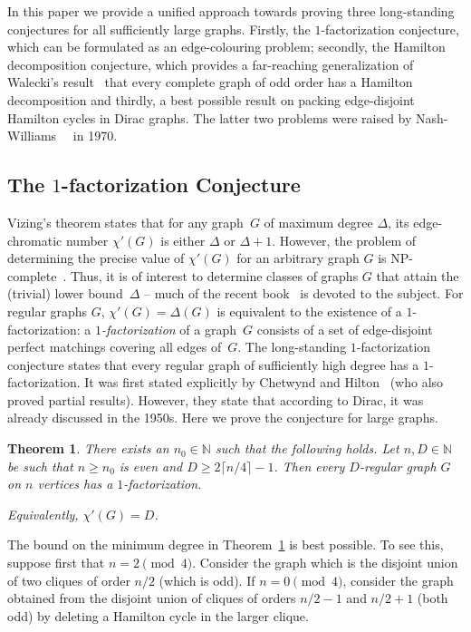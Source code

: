 \documentclass{memo-l}
\newtheorem{thm}[firstthm]{Theorem}
\def\COMMENT#1{}
\numberwithin{section}{chapter}
\numberwithin{equation}{section}
\numberwithin{firstthm}{section}
\numberwithin{figure}{section}
\begin{document}
In this paper we provide a unified approach towards proving three long-standing conjectures
for all sufficiently large graphs. Firstly, the $1$-factorization conjecture, which can be formulated as an edge-colouring problem;
secondly, the Hamilton decomposition conjecture, which provides a far-reaching generalization of Walecki's result~\cite{lucas} that
every complete graph of odd order has a Hamilton decomposition and  
thirdly, a best possible result on packing edge-disjoint 
Hamilton cycles in Dirac graphs. The latter two problems were raised by Nash-Williams~~\cite{initconj,Diracext,decompconj} in 1970. 


\subsection{The $1$-factorization Conjecture}

Vizing's theorem states that for any graph~$G$ of maximum degree $\Delta$, its edge-chromatic number
$\chi'(G)$ is either $\Delta$ or $\Delta+1$. 
However, the problem of determining the precise value of $\chi '(G)$
for an arbitrary graph $G$ is NP-complete~\cite{NP}. 
Thus, it is of interest to determine classes of graphs $G$ that attain the (trivial) lower bound~$\Delta$
-- much of the recent book~\cite{stiebitz} is devoted to the subject.
For regular graphs $G$, $\chi'(G)=\Delta(G)$ is equivalent to the existence of a $1$-factorization:
a \emph{$1$-factorization} of a graph~$G$ consists of a set of edge-disjoint perfect matchings covering all edges of~$G$.
The long-standing $1$-factorization conjecture states that every regular graph of sufficiently high degree has a 
$1$-factorization. It was first stated explicitly by Chetwynd and Hilton~\cite{1factorization,CH} (who also proved partial results).
However, they state that
according to Dirac, it was already discussed in the 1950s. Here we prove the conjecture for large graphs.

\begin{thm}\label{1factthm}
There exists an $n_0 \in \mathbb N$ such that the following holds.
Let $ n,D \in \mathbb N$ be such that $n\geq n_0$ is even and $D\geq 2\lceil n/4\rceil -1$. 
Then every $D$-regular graph $G$ on $n$ vertices has a $1$-factorization.%
    \COMMENT{So this means that $D\ge n/2$ if $n = 2 \pmod 4$ and $D\ge n/2-1$ if $n = 0 \pmod 4$.}
    Equivalently, $\chi'(G)=D$.
\end{thm}
The bound on the minimum degree in Theorem~\ref{1factthm} is best possible. To see this, suppose first that $n = 2 \pmod{4}$.
Consider the graph which is the disjoint union of two cliques of order $n/2$ (which is odd). If $n = 0 \pmod 4$,
consider the graph obtained from the disjoint union of cliques of orders $n/2-1$ and $n/2+1$ (both odd)
by deleting a Hamilton cycle in the larger clique.
\end{document}
